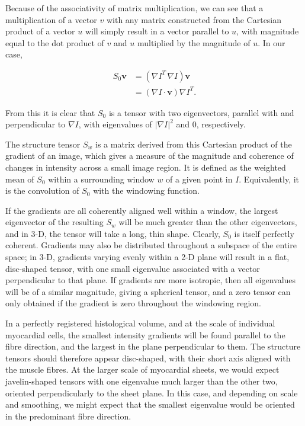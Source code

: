   Because of the associativity of matrix multiplication, we can see that a multiplication of a vector $v$ with any matrix constructed from the Cartesian product of a vector $u$ will simply result in a vector parallel to $u$, with magnitude equal to the dot product of $v$ and $u$ multiplied by the magnitude of $u$. In our case,
  
  \begin{align}
    S_0 \mathbf{v} &= (\nabla I^T \, \nabla I) \mathbf{v} \\
                   &= (\nabla I \cdot \mathbf{v}) \nabla I^T.
  \end{align}
  
  From this it is clear that $S_0$ is a tensor with two eigenvectors, parallel with and perpendicular to $\nabla I$, with eigenvalues of $|\nabla I|^2$ and 0, respectively.
  
  The structure tensor $S_w$ is a matrix derived from this Cartesian product of the gradient of an image, which gives a measure of the magnitude and coherence of changes in intensity across a small image region. It is defined as the weighted mean of $S_0$ within a surrounding window $w$ of a given point in $I$. Equivalently, it is the convolution of $S_0$ with the windowing function.
  
  If the gradients are all coherently aligned well within a window, the largest eigenvector of the resulting $S_w$ will be much greater than the other eigenvectors, and in 3-D, the tensor will take a long, thin shape. Clearly, $S_0$ is itself perfectly coherent. Gradients may also be distributed throughout a subspace of the entire space; in 3-D, gradients varying evenly within a 2-D plane will result in a flat, disc-shaped tensor, with one small eigenvalue associated with a vector perpendicular to that plane. If gradients are more isotropic, then all eigenvalues will be of a similar magnitude, giving a spherical tensor, and a zero tensor can only obtained if the gradient is zero throughout the windowing region.
  
  In a perfectly registered histological volume, and at the scale of individual myocardial cells, the smallest intensity gradients will be found parallel to the fibre direction, and the largest in the plane perpendicular to them. The structure tensors should therefore appear disc-shaped, with their short axis aligned with the muscle fibres. At the larger scale of myocardial sheets, we would expect javelin-shaped tensors with one eigenvalue much larger than the other two, oriented perpendicularly to the sheet plane. In this case, and depending on scale and smoothing, we might expect that the smallest eigenvalue would be oriented in the predominant fibre direction.
  
